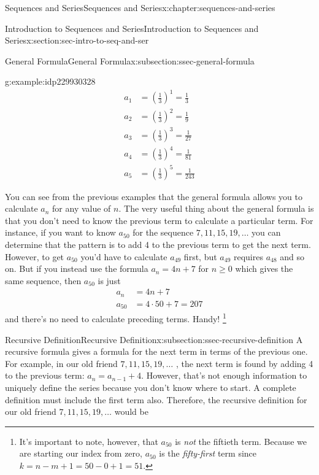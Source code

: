 \documentclass[twoside,10pt,]{book}
\numberwithin{equation}{section}
\newcommand{\amp}{&}
\begin{document}
\begin{chapterptx}{Sequences and Series}{}{Sequences and Series}{}{}{x:chapter:sequences-and-series}
\begin{sectionptx}{Introduction to Sequences and Series}{}{Introduction to Sequences and Series}{}{}{x:section:sec-intro-to-seq-and-ser}
\begin{subsectionptx}{General Formula}{}{General Formula}{}{}{x:subsection:ssec-general-formula}
\begin{example}{}{g:example:idp229930328}
\begin{align*}
{a_1} \amp = {\left( {\frac{1}{3}} \right)^1} = \frac{1}{3}\\
{a_2} \amp = {\left( {\frac{1}{3}} \right)^2} = \frac{1}{9}\\
{a_3} \amp = {\left( {\frac{1}{3}} \right)^3} = \frac{1}{{27}}\\
{a_4} \amp = {\left( {\frac{1}{3}} \right)^4} = \frac{1}{{81}}\\
{a_5} \amp = {\left( {\frac{1}{3}} \right)^5} = \frac{1}{{243}}
\end{align*}
\end{example}
%
\par
You can see from the previous examples that the general formula allows you to calculate \(a_n\) for any value of \(n\). The very useful thing about the general formula is that you don't need to know the previous term to calculate a particular term.  For instance, if you want to know \(a_{50}\) for the sequence  \(7, 11, 15, 19, \ldots\)  you can determine that the pattern is to add 4 to the previous term to get the next term.  However, to get \(a_{50}\)  you'd have to calculate \(a_{49}\) first, but \(a_{49}\) requires \(a_{48}\)  and so on.  But if you instead use the formula \({a_n} = 4n + 7\) for \(n \ge 0\)  which gives the same sequence, then \(a_{50}\) is just%
\begin{align*}
{a_n} \amp = 4n + 7\\
{a_{50}} \amp = 4 \cdot 50 + 7 = 207
\end{align*}
and there's no need to calculate preceding terms.  Handy!  \footnote{It's important to note, however, that \(a_{50}\) is \emph{not} the fiftieth term.  Because we are starting our index from zero, \(a_{50}\) is the \emph{fifty-first} term since \(k = n - m + 1 = 50 - 0 + 1 = 51\).\label{g:fn:idp229934424}}%
\end{subsectionptx}
%
%
\typeout{************************************************}
\typeout{************************************************}
%
\begin{subsectionptx}{Recursive Definition}{}{Recursive Definition}{}{}{x:subsection:ssec-recursive-definition}
A recursive formula gives a formula for the next term in terms of the previous one.  For example, in our old friend \(7, 11, 15, 19, \ldots\) , the next term is found by adding 4 to the previous term:  \({a_n} = {a_{n - 1}} + 4\).  However, that's not enough information to uniquely define the series because you don't know where to start.  A complete definition must include the first term also.  Therefore, the recursive definition for our old friend \(7, 11, 15, 19, \ldots\) would be%

\end{subsectionptx}
\end{sectionptx}
\end{chapterptx}
\end{document}
